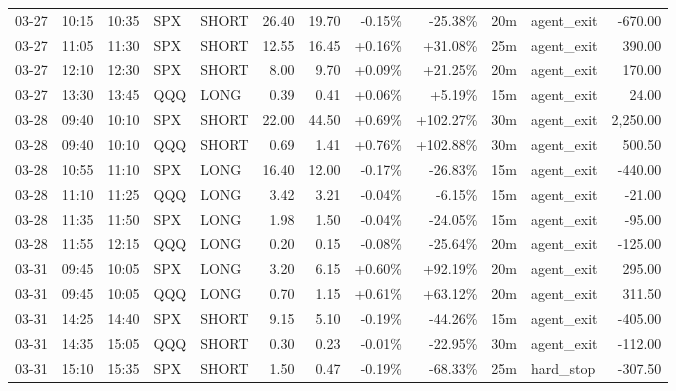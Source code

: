 \documentclass[11pt,a4paper]{article}
\begin{document}
\begin{center}
\begin{longtable}{>{\color{txtmain}}l l l l l r r r r r >{\color{txtmain}}l r}
03-27 & 10:15 & 10:35 & SPX & SHORT & 26.40 & 19.70 & \textcolor{lossred}{-0.15\%} & \textcolor{lossred}{-25.38\%} & 20m & agent\_exit & \textcolor{lossred}{-670.00} \\
03-27 & 11:05 & 11:30 & SPX & SHORT & 12.55 & 16.45 & \textcolor{wingreen}{+0.16\%} & \textcolor{wingreen}{+31.08\%} & 25m & agent\_exit & \textcolor{wingreen}{390.00} \\
03-27 & 12:10 & 12:30 & SPX & SHORT & 8.00 & 9.70 & \textcolor{wingreen}{+0.09\%} & \textcolor{wingreen}{+21.25\%} & 20m & agent\_exit & \textcolor{wingreen}{170.00} \\
03-27 & 13:30 & 13:45 & QQQ & LONG & 0.39 & 0.41 & \textcolor{wingreen}{+0.06\%} & \textcolor{wingreen}{+5.19\%} & 15m & agent\_exit & \textcolor{wingreen}{24.00} \\
03-28 & 09:40 & 10:10 & SPX & SHORT & 22.00 & 44.50 & \textcolor{wingreen}{+0.69\%} & \textcolor{wingreen}{+102.27\%} & 30m & agent\_exit & \textcolor{wingreen}{2,250.00} \\
03-28 & 09:40 & 10:10 & QQQ & SHORT & 0.69 & 1.41 & \textcolor{wingreen}{+0.76\%} & \textcolor{wingreen}{+102.88\%} & 30m & agent\_exit & \textcolor{wingreen}{500.50} \\
03-28 & 10:55 & 11:10 & SPX & LONG & 16.40 & 12.00 & \textcolor{lossred}{-0.17\%} & \textcolor{lossred}{-26.83\%} & 15m & agent\_exit & \textcolor{lossred}{-440.00} \\
03-28 & 11:10 & 11:25 & QQQ & LONG & 3.42 & 3.21 & \textcolor{lossred}{-0.04\%} & \textcolor{lossred}{-6.15\%} & 15m & agent\_exit & \textcolor{lossred}{-21.00} \\
03-28 & 11:35 & 11:50 & SPX & LONG & 1.98 & 1.50 & \textcolor{lossred}{-0.04\%} & \textcolor{lossred}{-24.05\%} & 15m & agent\_exit & \textcolor{lossred}{-95.00} \\
03-28 & 11:55 & 12:15 & QQQ & LONG & 0.20 & 0.15 & \textcolor{lossred}{-0.08\%} & \textcolor{lossred}{-25.64\%} & 20m & agent\_exit & \textcolor{lossred}{-125.00} \\
03-31 & 09:45 & 10:05 & SPX & LONG & 3.20 & 6.15 & \textcolor{wingreen}{+0.60\%} & \textcolor{wingreen}{+92.19\%} & 20m & agent\_exit & \textcolor{wingreen}{295.00} \\
03-31 & 09:45 & 10:05 & QQQ & LONG & 0.70 & 1.15 & \textcolor{wingreen}{+0.61\%} & \textcolor{wingreen}{+63.12\%} & 20m & agent\_exit & \textcolor{wingreen}{311.50} \\
03-31 & 14:25 & 14:40 & SPX & SHORT & 9.15 & 5.10 & \textcolor{lossred}{-0.19\%} & \textcolor{lossred}{-44.26\%} & 15m & agent\_exit & \textcolor{lossred}{-405.00} \\
03-31 & 14:35 & 15:05 & QQQ & SHORT & 0.30 & 0.23 & \textcolor{lossred}{-0.01\%} & \textcolor{lossred}{-22.95\%} & 30m & agent\_exit & \textcolor{lossred}{-112.00} \\
03-31 & 15:10 & 15:35 & SPX & SHORT & 1.50 & 0.47 & \textcolor{lossred}{-0.19\%} & \textcolor{lossred}{-68.33\%} & 25m & hard\_stop & \textcolor{lossred}{-307.50} \\
\end{longtable}
\end{center}
\clearpage
\end{document}
